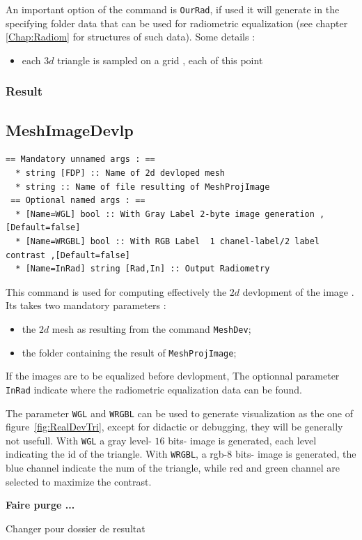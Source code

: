 An important option of the command is {\tt OurRad},  if used it will generate in
the specifying folder data that can be used for radiometric equalization (see
chapter \ref{Chap:Radiom} for structures of such data). Some details :

\begin{itemize}
    \item each $3d$ triangle is sampled on a grid , each of this point 

\end{itemize}



\subsubsection{Result}



\subsection{MeshImageDevlp}

\begin{verbatim}
== Mandatory unnamed args : ==
  * string [FDP] :: Name of 2d devloped mesh
  * string :: Name of file resulting of MeshProjImage
 == Optional named args : ==
  * [Name=WGL] bool :: With Gray Label 2-byte image generation ,[Default=false]
  * [Name=WRGBL] bool :: With RGB Label  1 chanel-label/2 label contrast ,[Default=false]
  * [Name=InRad] string [Rad,In] :: Output Radiometry 
\end{verbatim}

This command is used for computing effectively the $2d$ devlopment of the image . Its takes two mandatory
parameters :

\begin{itemize}
   \item the $2d$ mesh as resulting from the command {\tt MeshDev};
   \item the folder containing the result of {\tt MeshProjImage};
\end{itemize}

If the images are to be equalized before devlopment, The optionnal parameter {\tt InRad} 
indicate where the radiometric equalization data can be found.  

The parameter {\tt WGL} and {\tt WRGBL} can be used to generate visualization as the one
of figure~\ref{fig:RealDevTri}, except for didactic or debugging, they will be generally not usefull.
 With {\tt WGL} a gray level- $16$ bits- image is generated,
each level indicating the id of the triangle. With {\tt WRGBL}, a rgb-$8$ bits- image is generated, the 
blue channel indicate the num of the triangle, while red and green channel are selected to maximize
the contrast.



{ \huge \bf
Faire purge ...

Changer pour dossier de resultat
}


